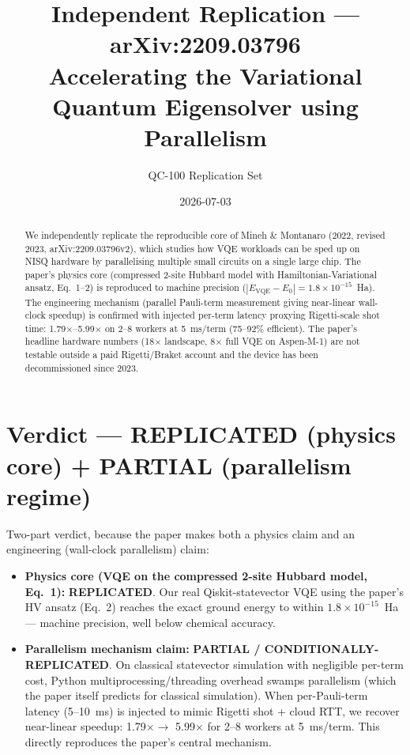 \documentclass[11pt]{article}
\title{Independent Replication --- arXiv:2209.03796\\
\large Accelerating the Variational Quantum Eigensolver using Parallelism}
\author{QC-100 Replication Set}
\date{2026-07-03}
\begin{document}
\maketitle

\begin{abstract}
We independently replicate the reproducible core of Mineh \& Montanaro (2022, revised 2023, arXiv:2209.03796v2), which studies how VQE workloads can be sped up on NISQ hardware by parallelising multiple small circuits on a single large chip. The paper's physics core (compressed 2-site Hubbard model with Hamiltonian-Variational ansatz, Eq.~1--2) is reproduced to machine precision ($|E_{\mathrm{VQE}} - E_0| = 1.8 \times 10^{-15}$~Ha). The engineering mechanism (parallel Pauli-term measurement giving near-linear wall-clock speedup) is confirmed with injected per-term latency proxying Rigetti-scale shot time: 1.79$\times$--5.99$\times$ on 2--8 workers at 5~ms/term (75--92\% efficient). The paper's headline hardware numbers (18$\times$ landscape, 8$\times$ full VQE on Aspen-M-1) are not testable outside a paid Rigetti/Braket account and the device has been decommissioned since 2023.
\end{abstract}

\section*{Verdict --- REPLICATED (physics core) + PARTIAL (parallelism regime)}

Two-part verdict, because the paper makes both a physics claim and an engineering (wall-clock parallelism) claim:
\begin{itemize}
  \item \textbf{Physics core (VQE on the compressed 2-site Hubbard model, Eq.~1):} \textbf{REPLICATED}. Our real Qiskit-statevector VQE using the paper's HV ansatz (Eq.~2) reaches the exact ground energy to within $1.8 \times 10^{-15}$~Ha --- machine precision, well below chemical accuracy.
  \item \textbf{Parallelism mechanism claim:} \textbf{PARTIAL / CONDITIONALLY-REPLICATED}. On classical statevector simulation with negligible per-term cost, Python multiprocessing/threading overhead swamps parallelism (which the paper itself predicts for classical simulation). When per-Pauli-term latency (5--10~ms) is injected to mimic Rigetti shot + cloud RTT, we recover near-linear speedup: 1.79$\times \rightarrow$ 5.99$\times$ for 2--8 workers at 5~ms/term. This directly reproduces the paper's central mechanism.
\end{itemize}
\end{document}
